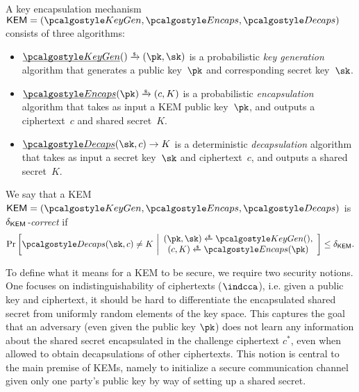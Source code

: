 \begin{definition}
    \label{def:kem}
    A key encapsulation mechanism $\KEM = (\kgen, \encaps, \decaps)$ consists of three algorithms:
    \begin{itemize}
        \item $\ul{\kgen}() \tor (\pk, \sk)$
        is a probabilistic \emph{key generation} algorithm that generates a public key~$\pk$ and corresponding secret key~$\sk$.
        \item $\ul{\encaps}(\pk) \tor (c, K)$
        is a probabilistic \emph{encapsulation} algorithm that takes as input a KEM public key~$\pk$, and outputs a ciphertext~$c$ and shared secret~$K$.
        \item $\ul{\decaps}(\sk, c) \to K$
        is a deterministic \emph{decapsulation} algorithm that takes as input a secret key~$\sk$ and ciphertext~$c$, and outputs a shared secret~$K$.
    \end{itemize}
\end{definition}

\begin{definition}
\label{def:kem-corr}
We say that a KEM~$\KEM=(\kgen, \encaps, \decaps)$ is \emph{$\delta_{\mathsf{KEM}}$-correct} if
\[
    \Pr\left[
        \decaps(\sk,c) \neq K
    ~\middle|
        \begin{array}{c}
        (\pk,\sk) \getsr \kgen(), \\
        (c, K) \getsr \encaps(\pk)
        \end{array}
    \right] \leq \delta_\KEM.
\]
\end{definition}

To define what it means for a KEM to be secure, we require two security notions. One focuses on indistinguishability of ciphertexts ($\indcca$), i.e. given a public key and ciphertext, it should be hard to differentiate the encapsulated shared secret from uniformly random elements of the key space.
This captures the goal that an adversary (even given the public key $\pk$) does not learn any information about the shared secret encapsulated in the challenge ciphertext $c^*$, even when allowed to obtain decapsulations of other ciphertexts.
This notion is central to the main premise of KEMs, namely to initialize a secure communication channel given only one party's public key by way of setting up a shared secret.

